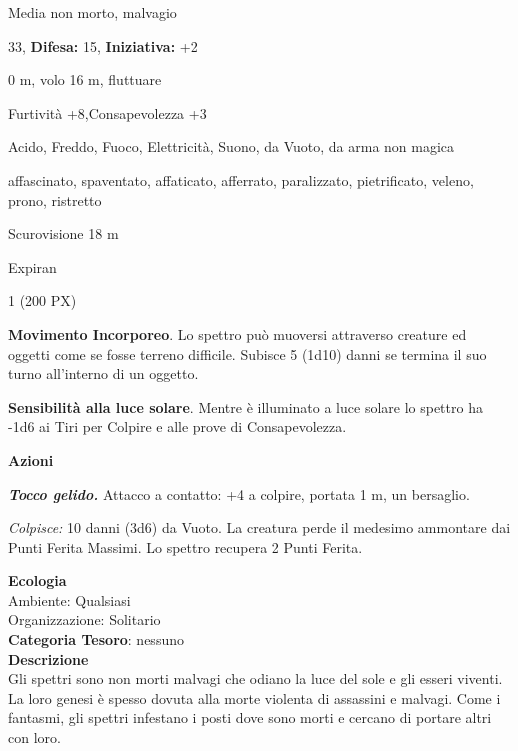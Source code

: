 \begin{multicols}{2}
{
\noindent
\begin{description}[noitemsep, topsep=0pt, parsep=0pt, partopsep=0pt, leftmargin=0cm, labelwidth=2.2cm]
	\item[\textbf{Taglia/Tipo:}] Media non morto, malvagio
	\item[\textbf{Caratt.:}] 
	\item[\textbf{Punti Ferita:}] 33,  \textbf{Difesa:} 15,  \textbf{Iniziativa:} +2
	\item[\textbf{Movimento:}] 0 m, volo 16 m, fluttuare
	\item[\textbf{Tiri Salvez.:}] 
	\item[\textbf{Comp.:}] Furtività +8,Consapevolezza +3
	\item[\textbf{Res. Danni:}] Acido, Freddo, Fuoco, Elettricità, Suono, da Vuoto, da arma non magica
	\item[\textbf{Immunità:}] affascinato, spaventato, affaticato, afferrato, paralizzato, pietrificato, veleno, prono, ristretto
	\item[\textbf{Sensi:}] Scurovisione 18 m
	\item[\textbf{Lingue:}] Expiran
	\item[\textbf{Sfida:}] 1 (200 PX)\smallskip
\end{description}

\textbf{Movimento Incorporeo}. Lo spettro può muoversi attraverso creature ed oggetti come se fosse terreno difficile. Subisce 5 (1d10) danni se termina il suo turno all'interno di un oggetto.

\textbf{Sensibilità alla luce solare}. Mentre è illuminato a luce solare lo spettro ha -1d6 ai Tiri per Colpire e alle prove di Consapevolezza.

\textbf{Azioni}

\emph{\textbf{Tocco gelido.}} Attacco a contatto: +4 a colpire, portata 1 m, un bersaglio.

\emph{Colpisce:} 10 danni (3d6) da Vuoto. La creatura perde il medesimo ammontare dai Punti Ferita Massimi. Lo spettro recupera 2 Punti Ferita.

\textbf{Ecologia}\\
Ambiente: Qualsiasi\\
Organizzazione: Solitario\\
\textbf{Categoria Tesoro}: nessuno\\
\textbf{Descrizione}\\
Gli spettri sono non morti malvagi che odiano la luce del sole e gli esseri viventi. La loro genesi è spesso dovuta alla morte violenta di assassini e malvagi. Come i fantasmi, gli spettri infestano i posti dove sono morti e cercano di portare altri con loro.

}
\end{multicols}
